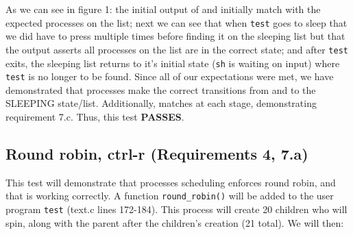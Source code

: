 \documentclass[11pt,letterpaper]{report}
\begin{document}
As we can see in figure 1: the initial output of  and  initially match with the expected processes on the list; next we can see that when {\tt test} goes to sleep that we did have to press  multiple times
before finding it on the sleeping list but that the  output asserts all processes on the list are in the correct state; and after {\tt test} exits, the sleeping list returns to it's initial state ({\tt sh} is waiting on input)
where {\tt test} is no longer to be found. Since all of our expectations were met, we have demonstrated that processes make the correct transitions from and to the SLEEPING state/list. Additionally,  matches 
 at each stage, demonstrating requirement 7.c. Thus, this test \textbf{PASSES}.

\subsection*{Round robin, ctrl-r (Requirements 4, 7.a)}
This test will demonstrate that processes scheduling enforces round robin, and that  is working correctly. A function {\tt round\_robin()} will be added to the user program {\tt test} (text.c lines 172-184). This process will
create 20 children who will spin, along with the parent after the children's creation (21 total). We will then:
\end{document}
